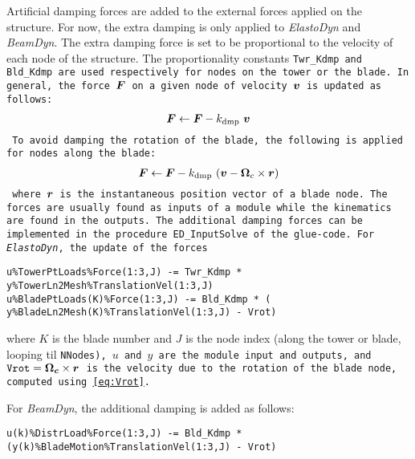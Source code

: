 \documentclass[11pt]{article}
\begin{document}
\label{sec:damping}
Artificial damping forces are added to the external forces applied on the structure.
For now, the extra damping is only applied to \textit{ElastoDyn} and \textit{BeamDyn}.
% 
The extra damping force is set to be proportional to the velocity of each node of the structure. The proportionality constants \tt{Twr\_Kdmp} and \tt{Bld\_Kdmp} are used respectively for nodes on the tower or the blade. 
% 
In general, the force $\boldsymbol{F}$ on a given node of velocity $\boldsymbol{v}$ is updated as follows:
\begin{align}
    \boldsymbol{F} \leftarrow  \boldsymbol{F}  -  k_\text{dmp}\  \boldsymbol{v}
\end{align}
To avoid damping the rotation of the blade, the following is applied for nodes along the blade:
\begin{align}
    \boldsymbol{F} \leftarrow  \boldsymbol{F}  -  k_\text{dmp}\  (\boldsymbol{v}-\boldsymbol{\Omega}_c\times \boldsymbol{r})
\end{align}
where $\boldsymbol{r}$ is the instantaneous position vector of a blade node.
The forces are usually found as inputs of a module while the kinematics are found in the outputs. 
% 
The additional damping forces can be implemented in the procedure \tt{ED\_InputSolve} of the glue-code.
For \textit{ElastoDyn}, the update of the forces 
\begin{lstlisting}
u%TowerPtLoads%Force(1:3,J) -= Twr_Kdmp * y%TowerLn2Mesh%TranslationVel(1:3,J)
u%BladePtLoads(K)%Force(1:3,J) -= Bld_Kdmp * ( y%BladeLn2Mesh(K)%TranslationVel(1:3,J) - Vrot)
\end{lstlisting}
where $K$ is the blade number and $J$ is the node index (along the tower or blade, looping til \tt{NNodes}), $u$ and $y$ are the module input and outputs, and $\texttt{Vrot}=\boldsymbol{\Omega_c}\times\boldsymbol{r}$
is the velocity due to the rotation of the blade node, computed using \autoref{eq:Vrot}.

For \textit{BeamDyn}, the additional damping is added as follows:
\begin{lstlisting}
u(k)%DistrLoad%Force(1:3,J) -= Bld_Kdmp * (y(k)%BladeMotion%TranslationVel(1:3,J) - Vrot)
\end{lstlisting}
\end{document}

